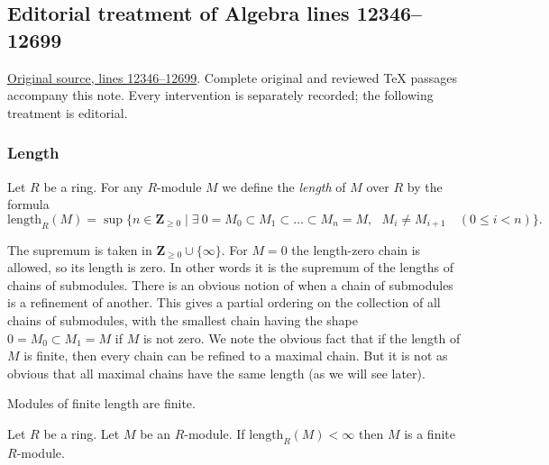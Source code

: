 \subsection{Editorial treatment of Algebra lines 12346--12699}

\hypertarget{algebra-context-165}{}

\noindent\href{https://github.com/stacks/stacks-project/blob/a04446e57ec1fbc252a871afcec7752fb2807b14/algebra.tex\#L12346}{Original source, lines 12346--12699}. Complete original and reviewed TeX passages accompany this note. Every intervention is separately recorded; the following treatment is editorial.


\subsubsection{Length}
\label{editorial-source-section-length}

\begin{definition}
\label{editorial-source-definition-length}
Let $R$ be a ring. For any $R$-module $M$
we define the {\it length} of $M$ over $R$ by the
formula
$$
\text{length}_R(M)
=
\sup
\{
n \in \mathbf Z_{\geq0}
\mid
\exists\ 0 = M_0 \subset M_1 \subset \ldots \subset M_n = M,
\text{ }M_i \not = M_{i + 1}\quad(0\leq i<n)
\}.
$$
\end{definition}

\noindent
The supremum is taken in $\mathbf Z_{\geq0}\cup\{\infty\}$.
For $M=0$ the length-zero chain is allowed, so its length is zero.
In other words it is the supremum of the lengths of chains
of submodules. There is an obvious notion of when a chain
of submodules is a refinement of another. This gives a
partial ordering on the collection of all chains of submodules,
with the smallest chain having the shape $0 = M_0 \subset M_1 = M$
if $M$ is not zero.
We note the obvious fact that if the length of
$M$ is finite, then every chain can be refined to a
maximal chain. But it is not as obvious that all maximal
chains have the same length (as we will see later).

\begin{lemma}
\label{editorial-source-lemma-finite-length-finite}
\begin{slogan}
Modules of finite length are finite.
\end{slogan}
Let $R$ be a ring.
Let $M$ be an $R$-module.
If $\text{length}_R(M) < \infty$ then $M$ is a finite $R$-module.
\end{lemma}


